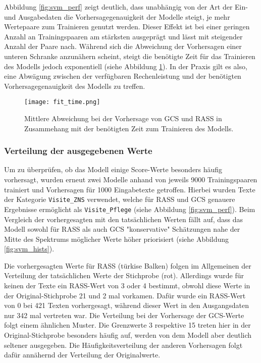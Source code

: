 Abbildung \ref{fig:svm_perf} zeigt deutlich, dass unabhängig von der Art der Ein- und Ausgabedaten die Vorhersagegenauigkeit der Modelle steigt, je mehr Wertepaare zum Trainieren genutzt werden. Dieser Effekt ist bei einer geringen Anzahl an Trainingspaaren am stärksten ausgeprägt und lässt mit steigender Anzahl der Paare nach. Während sich die Abweichung der Vorhersagen einer unteren Schranke anzunähern scheint, steigt die benötigte Zeit für das Trainieren des Modells jedoch exponentiell (siehe Abbildung \ref{fig:fittime}). In der Praxis gilt es also, eine Abwägung zwischen der verfügbaren Rechenleistung und der benötigten Vorhersagegenauigkeit des Modells zu treffen.
 
\begin{figure}[htb]
    \captionsetup{justification=centering}
    \centering
    \texttt{[image: fit\_time.png]}
    \caption{Mittlere Abweichung bei der Vorhersage von GCS und RASS in Zusammehang mit der benötigten Zeit zum Trainieren des Modells.}
    \label{fig:fittime}
\end{figure}

\subsubsection{Verteilung der ausgegebenen Werte}
Um zu überprüfen, ob das Modell einige Score-Werte besonders häufig vorhersagt, wurden erneut zwei Modelle anhand von jeweils 9000 Trainingspaaren trainiert und Vorhersagen für 1000 Eingabetexte getroffen. Hierbei wurden Texte der Kategorie \texttt{Visite\_ZNS} verwendet, welche für RASS und GCS genauere Ergebnisse ermöglicht als \texttt{Visite\_Pflege} (siehe Abbildung \ref{fig:svm_perf}). Beim Vergleich der vorhergesagten mit den tatsächlichen Werten fällt auf, dass das Modell sowohl für RASS als auch GCS "konservative" Schätzungen nahe der Mitte des Spektrums möglicher Werte höher priorisiert (siehe Abbildung \ref{fig:svm_hists}).

Die vorhergesagten Werte für RASS (türkise Balken) folgen im Allgemeinen der Verteilung der tatsächlichen Werte der Stichprobe (rot). Allerdings wurde für keinen der Texte ein RASS-Wert von 3 oder 4 bestimmt, obwohl diese Werte in der Original-Stichprobe 21 und 2 mal vorkamen. Dafür wurde ein RASS-Wert von 0 bei 421 Texten vorhergesagt, während dieser Wert in den Ausgangsdaten nur 342 mal vertreten war. Die Verteilung bei der Vorhersage der GCS-Werte folgt einem ähnlichen Muster. Die Grenzwerte 3 respektive 15 treten hier in der Original-Stichprobe besonders häufig auf, werden von dem Modell aber deutlich seltener ausgegeben. Die Häufigkeitsverteilung der anderen Vorhersagen folgt dafür annähernd der Verteilung der Originalwerte.

